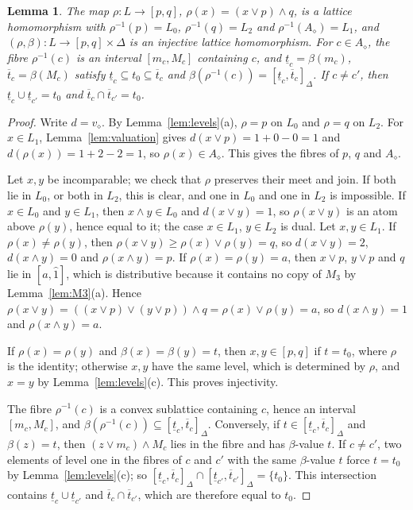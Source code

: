 \documentclass{amsart}
\newtheorem{lemma}[theorem]{Lemma}
\theoremstyle{definition}
\newcommand{\dm}{\diamond}
\newcommand{\lt}{\underline{t}}
\newcommand{\ut}{\overline{t}}
\begin{document}
\begin{lemma}\label{lem:rho}
	The map $\rho:L\to[p,q]$, $\rho(x)=(x\vee p)\wedge q$, is a lattice homomorphism with $\rho^{-1}(p)=L_0$, $\rho^{-1}(q)=L_2$ and $\rho^{-1}(A_\dm)=L_1$, and $(\rho,\beta):L\to[p,q]\times\Delta$ is an injective lattice homomorphism. For $c\in A_\dm$, the fibre $\rho^{-1}(c)$ is an interval $[m_c,M_c]$ containing $c$, and $\lt_c=\beta(m_c)$, $\ut_c=\beta(M_c)$ satisfy $\lt_c\subseteq t_0\subseteq\ut_c$ and $\beta(\rho^{-1}(c))=[\lt_c,\ut_c]_\Delta$. If $c\ne c'$, then $\lt_c\cup\lt_{c'}=t_0$ and $\ut_c\cap\ut_{c'}=t_0$.
\end{lemma}

\begin{proof}
	Write $d=v_\dm$. By Lemma~\ref{lem:levels}(a), $\rho=p$ on $L_0$ and $\rho=q$ on $L_2$. For $x\in L_1$, Lemma~\ref{lem:valuation} gives $d(x\vee p)=1+0-0=1$ and $d(\rho(x))=1+2-2=1$, so $\rho(x)\in A_\dm$. This gives the fibres of $p$, $q$ and $A_\dm$.

	Let $x,y$ be incomparable; we check that $\rho$ preserves their meet and join. If both lie in $L_0$, or both in $L_2$, this is clear, and one in $L_0$ and one in $L_2$ is impossible. If $x\in L_0$ and $y\in L_1$, then $x\wedge y\in L_0$ and $d(x\vee y)=1$, so $\rho(x\vee y)$ is an atom above $\rho(y)$, hence equal to it; the case $x\in L_1$, $y\in L_2$ is dual. Let $x,y\in L_1$. If $\rho(x)\ne\rho(y)$, then $\rho(x\vee y)\ge\rho(x)\vee\rho(y)=q$, so $d(x\vee y)=2$, $d(x\wedge y)=0$ and $\rho(x\wedge y)=p$. If $\rho(x)=\rho(y)=a$, then $x\vee p$, $y\vee p$ and $q$ lie in $[a,\hat1]$, which is distributive because it contains no copy of $M_3$ by Lemma~\ref{lem:M3}(a). Hence $\rho(x\vee y)=((x\vee p)\vee(y\vee p))\wedge q=\rho(x)\vee\rho(y)=a$, so $d(x\wedge y)=1$ and $\rho(x\wedge y)=a$.

	If $\rho(x)=\rho(y)$ and $\beta(x)=\beta(y)=t$, then $x,y\in[p,q]$ if $t=t_0$, where $\rho$ is the identity; otherwise $x,y$ have the same level, which is determined by $\rho$, and $x=y$ by Lemma~\ref{lem:levels}(c). This proves injectivity.

	The fibre $\rho^{-1}(c)$ is a convex sublattice containing $c$, hence an interval $[m_c,M_c]$, and $\beta(\rho^{-1}(c))\subseteq[\lt_c,\ut_c]_\Delta$. Conversely, if $t\in[\lt_c,\ut_c]_\Delta$ and $\beta(z)=t$, then $(z\vee m_c)\wedge M_c$ lies in the fibre and has $\beta$-value $t$. If $c\ne c'$, two elements of level one in the fibres of $c$ and $c'$ with the same $\beta$-value $t$ force $t=t_0$ by Lemma~\ref{lem:levels}(c); so $[\lt_c,\ut_c]_\Delta\cap[\lt_{c'},\ut_{c'}]_\Delta=\{t_0\}$. This intersection contains $\lt_c\cup\lt_{c'}$ and $\ut_c\cap\ut_{c'}$, which are therefore equal to $t_0$.
\end{proof}
\end{document}
